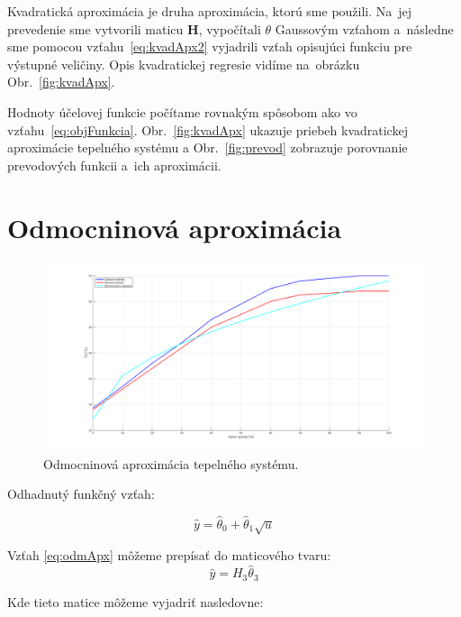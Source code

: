 \documentclass{article}
\begin{document}
Kvadratická aproximácia je druha aproximácia, ktorú sme použili.
Na~jej prevedenie sme vytvorili maticu \textbf{H}, vypočítali
\(\theta\) Gaussovým vzťahom a~následne sme pomocou vzťahu~\ref{eq:kvadApx2}
vyjadrili vzťah opisujúci funkciu pre výstupné veličiny. Opis kvadratickej
regresie vidíme na~obrázku Obr.~\ref{fig:kvadApx}.

Hodnoty účelovej funkcie počítame rovnakým spôsobom ako vo vzťahu~\ref{eq:objFunkcia}.
Obr.~\ref{fig:kvadApx} ukazuje priebeh kvadratickej aproximácie tepelného systému a
Obr.~\ref{fig:prevod} zobrazuje porovnanie prevodových funkcii a~ich aproximácii.

\clearpage

\section{Odmocninová aproximácia}
\label{sec:odm}

\begin{figure}[!htbp]
	\begin{center}
		\includegraphics[width=\textwidth]{include/odmocninova_regresia.png}
	\end{center}
	\caption{Odmocninová aproximácia tepelného systému.}
	\label{fig:odmApx}
\end{figure}

Odhadnutý funkčný vzťah:

\begin{equation}
	\hat{y} = \hat{\theta}_0 + \hat{\theta}_1 \sqrt{u}
	\label{eq:odmApx}
\end{equation}

Vzťah \ref{eq:odmApx} môžeme prepísať do maticového tvaru:
\begin{equation}
	\hat{y} = H_3\hat{\theta}_3
	\label{eq:odmApx2}
\end{equation}

Kde tieto matice môžeme vyjadriť nasledovne:
\end{document}
